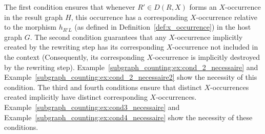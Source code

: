 The first condition ensures that whenever $R' \mathop{\in} D(R,X)$ forms an $X$-occurrence in the result graph $H$, this occurrence has a corresponding $X$-occurrence relative to the morphism $h_{R'L}$ (as defined in Definition~\ref{def:x_occurrence}) in the host graph $G$.
The second condition guarantees that any $X$-occurrence implicitly created by the rewriting step has its corresponding $X$-occurrence not included in the context (Consequently, its corresponding $X$-occurrence is implicitly destroyed by the rewriting step). Example~\ref{subgraph_counting:ex:cond_2_necessaire} and Example~\ref{subgraph_counting:ex:cond_2_necessaire2} show the necessity of this condition.
The third and fourth conditions ensure that distinct $X$-occurrences created implicitly have distinct corresponding $X$-occurrences.
Example~\ref{subgraph_counting:ex:cond3_necessaire} and Example~\ref{subgraph_counting:ex:cond4_necessaire} show the necessity of these conditions.

